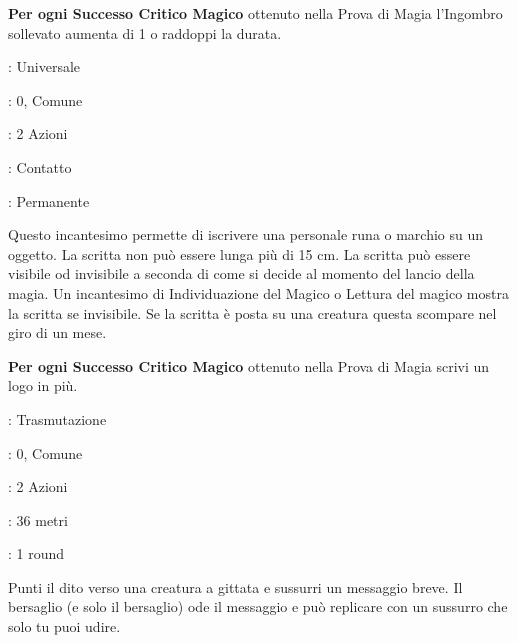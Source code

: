 \begin{multicols}{2}
\textbf{Per ogni Successo Critico Magico} ottenuto nella Prova di Magia l'Ingombro sollevato aumenta di 1 o raddoppi la durata.


\noindent\colorbox{OBSSgold!10}{
\begin{minipage}{0.95\linewidth}
\begin{description}[noitemsep, topsep=0pt, parsep=0pt, partopsep=0pt, leftmargin=0cm, labelwidth=1.3cm]
	\item[\textbf{Lista}]: Universale
	\item[\textbf{Livello}]: 0, Comune
	\item[\textbf{Lancio}]: 2 Azioni
	\item[\textbf{Gittata}]: Contatto
	\item[\textbf{Durata}]: Permanente
\end{description}
\end{minipage}}\smallskip

Questo incantesimo permette di iscrivere una personale runa o marchio su un oggetto. La scritta non può essere lunga più di 15 cm. La scritta può essere visibile od invisibile a seconda di come si decide al momento del lancio della magia.
Un incantesimo di Individuazione del Magico o Lettura del magico mostra la scritta se invisibile.
Se la scritta è posta su una creatura questa scompare nel giro di un mese.

\textbf{Per ogni Successo Critico Magico} ottenuto nella Prova di Magia scrivi un logo in più.

\noindent\colorbox{OBSSgold!10}{
\begin{minipage}{0.95\linewidth}
\begin{description}[noitemsep, topsep=0pt, parsep=0pt, partopsep=0pt, leftmargin=0cm, labelwidth=1.3cm]
	\item[\textbf{Lista}]: Trasmutazione
	\item[\textbf{Livello}]: 0, Comune
	\item[\textbf{Lancio}]: 2 Azioni
	\item[\textbf{Gittata}]: 36 metri
	\item[\textbf{Durata}]: 1 round
\end{description}
\end{minipage}}\smallskip

Punti il dito verso una creatura a gittata e sussurri un messaggio breve. Il bersaglio (e solo il bersaglio) ode il messaggio e può replicare con un sussurro che solo tu puoi udire.


\end{multicols}
